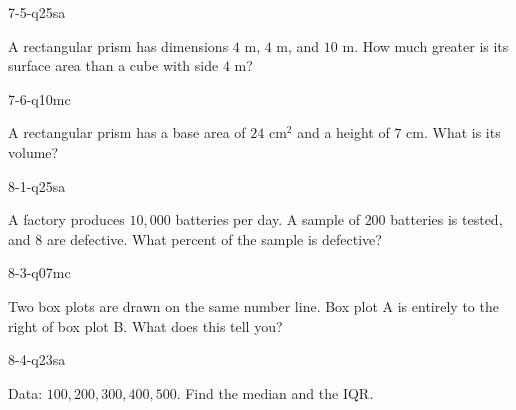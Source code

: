 \begin{practiceQuestion}{7-5-q25}{sa}
\begin{questionText}
A rectangular prism has dimensions $4$ m, $4$ m, and $10$ m. How much greater is its surface area than a cube with side $4$ m?
\end{questionText}
\end{practiceQuestion}

\begin{practiceQuestion}{7-6-q10}{mc}
\begin{questionText}
A rectangular prism has a base area of $24$ cm$^2$ and a height of $7$ cm. What is its volume?
\end{questionText}
\end{practiceQuestion}

\begin{practiceQuestion}{8-1-q25}{sa}
\begin{questionText}
A factory produces $10{,}000$ batteries per day. A sample of $200$ batteries is tested, and $8$ are defective. What percent of the sample is defective?
\end{questionText}
\end{practiceQuestion}

\begin{practiceQuestion}{8-3-q07}{mc}
\begin{questionText}
Two box plots are drawn on the same number line. Box plot A is entirely to the right of box plot B. What does this tell you?
\end{questionText}
\end{practiceQuestion}

\begin{practiceQuestion}{8-4-q23}{sa}
\begin{questionText}
Data: $100, 200, 300, 400, 500$. Find the median and the IQR.
\end{questionText}
\end{practiceQuestion}


